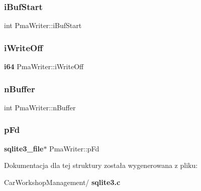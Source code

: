 \mbox{\label{struct_pma_writer_ae77a80d66a5f3d40cd5d57861a455281}} 
\subsubsection{iBufStart}
{\footnotesize\ttfamily int Pma\+Writer\+::i\+Buf\+Start}

\mbox{\label{struct_pma_writer_ad45a9271cbcdd0e506b81b77d2a744a5}} 
\subsubsection{iWriteOff}
{\footnotesize\ttfamily \textbf{ i64} Pma\+Writer\+::i\+Write\+Off}

\mbox{\label{struct_pma_writer_a5d8e651696b33ff6318e7d8473ee9e1b}} 
\subsubsection{nBuffer}
{\footnotesize\ttfamily int Pma\+Writer\+::n\+Buffer}

\mbox{\label{struct_pma_writer_a54606c98fb9e7318a55ed59de0e55550}} 
\subsubsection{pFd}
{\footnotesize\ttfamily \textbf{ sqlite3\+\_\+file}$\ast$ Pma\+Writer\+::p\+Fd}



Dokumentacja dla tej struktury została wygenerowana z pliku\+:\begin{DoxyCompactItemize}
\item 
Car\+Workshop\+Management/\textbf{ sqlite3.\+c}\end{DoxyCompactItemize}
